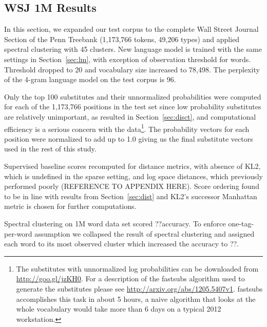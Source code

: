 \subsection{WSJ 1M Results}
\label{sec:wsj}

In this section, we expanded our test corpus to the complete Wall
Street Journal Section of the Penn Treebank \cite{treebank3}
(1,173,766 tokens, 49,206 types) and applied spectral clustering
with 45 clusters.
%
New language model is trained with the same settings in
Section~\ref{sec:lm}, with exception of observation threshold for
words.  Threshold dropped to 20 and vocabulary size increased to
78,498.
%
The perplexity of the 4-gram language model on the test corpus is 96.

Only the top 100 substitutes and their unnormalized probabilities were
computed for each of the 1,173,766 positions in the test set since low
probability substitutes are relatively unimportant, as resulted in
Section~\ref{sec:disct}, and computational efficiency is a serious
concern with the data\footnote{The substitutes with unnormalized log
  probabilities can be downloaded from
  \mbox{\url{http://goo.gl/jzKH0}}.  For a description of the {\sc
    fastsubs} algorithm used to generate the substitutes please see
  \mbox{\url{http://arxiv.org/abs/1205.5407v1}}.  {\sc fastsubs}
  accomplishes this task in about 5 hours, a naive algorithm that
  looks at the whole vocabulary would take more than 6 days on a
  typical 2012 workstation.}.  The probability vectors for each
position were normalized to add up to 1.0 giving us the final
substitute vectors used in the rest of this study.

Supervised baseline scores recomputed for distance metrics, with
absence of KL2, which is undefined in the sparse setting, and log
space distances, which previously performed poorly (REFERENCE TO
APPENDIX HERE). Score ordering found to be in line with results from
Section~\ref{sec:dist} and KL2's successor Manhattan metric is chosen
for further computations.


Spectral clustering on 1M word data set scored ??\mto accuracy.  To
enforce one-tag-per-word assumption we collapsed the result of
spectral clustering and assigned each word to its most observed
cluster which increased the \mto accuracy to ??.
